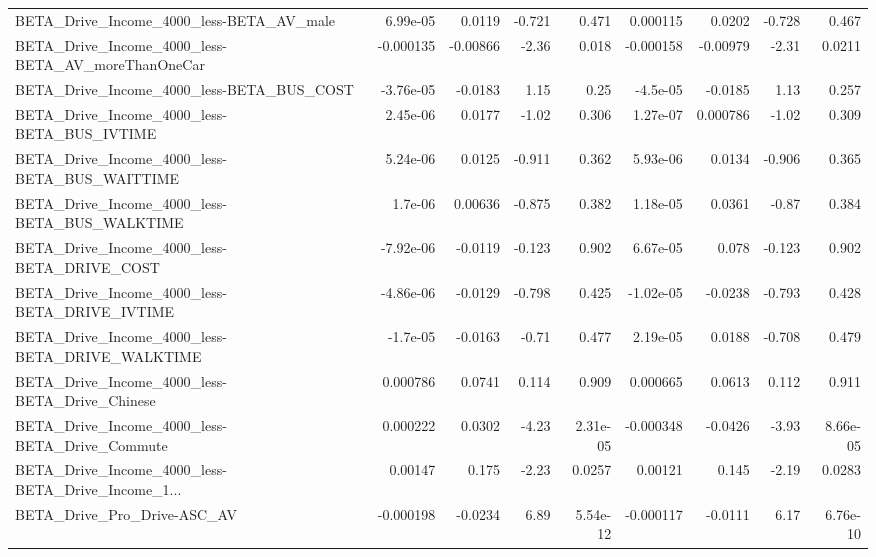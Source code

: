 \begin{tabular}{lrrrrrrrr}
BETA\_Drive\_Income\_4000\_less-BETA\_AV\_male           &    6.99e-05 &       0.0119 &    -0.721 &    0.471 &   0.000115 &      0.0202 &       -0.728 &         0.467 \\
BETA\_Drive\_Income\_4000\_less-BETA\_AV\_moreThanOneCar &   -0.000135 &     -0.00866 &     -2.36 &    0.018 &  -0.000158 &    -0.00979 &        -2.31 &        0.0211 \\
BETA\_Drive\_Income\_4000\_less-BETA\_BUS\_COST          &   -3.76e-05 &      -0.0183 &      1.15 &     0.25 &   -4.5e-05 &     -0.0185 &         1.13 &         0.257 \\
BETA\_Drive\_Income\_4000\_less-BETA\_BUS\_IVTIME        &    2.45e-06 &       0.0177 &     -1.02 &    0.306 &   1.27e-07 &    0.000786 &        -1.02 &         0.309 \\
BETA\_Drive\_Income\_4000\_less-BETA\_BUS\_WAITTIME      &    5.24e-06 &       0.0125 &    -0.911 &    0.362 &   5.93e-06 &      0.0134 &       -0.906 &         0.365 \\
BETA\_Drive\_Income\_4000\_less-BETA\_BUS\_WALKTIME      &     1.7e-06 &      0.00636 &    -0.875 &    0.382 &   1.18e-05 &      0.0361 &        -0.87 &         0.384 \\
BETA\_Drive\_Income\_4000\_less-BETA\_DRIVE\_COST        &   -7.92e-06 &      -0.0119 &    -0.123 &    0.902 &   6.67e-05 &       0.078 &       -0.123 &         0.902 \\
BETA\_Drive\_Income\_4000\_less-BETA\_DRIVE\_IVTIME      &   -4.86e-06 &      -0.0129 &    -0.798 &    0.425 &  -1.02e-05 &     -0.0238 &       -0.793 &         0.428 \\
BETA\_Drive\_Income\_4000\_less-BETA\_DRIVE\_WALKTIME    &    -1.7e-05 &      -0.0163 &     -0.71 &    0.477 &   2.19e-05 &      0.0188 &       -0.708 &         0.479 \\
BETA\_Drive\_Income\_4000\_less-BETA\_Drive\_Chinese     &    0.000786 &       0.0741 &     0.114 &    0.909 &   0.000665 &      0.0613 &        0.112 &         0.911 \\
BETA\_Drive\_Income\_4000\_less-BETA\_Drive\_Commute     &    0.000222 &       0.0302 &     -4.23 & 2.31e-05 &  -0.000348 &     -0.0426 &        -3.93 &      8.66e-05 \\
BETA\_Drive\_Income\_4000\_less-BETA\_Drive\_Income\_1... &     0.00147 &        0.175 &     -2.23 &   0.0257 &    0.00121 &       0.145 &        -2.19 &        0.0283 \\
BETA\_Drive\_Pro\_Drive-ASC\_AV                        &   -0.000198 &      -0.0234 &      6.89 & 5.54e-12 &  -0.000117 &     -0.0111 &         6.17 &      6.76e-10 \\

\end{tabular}
